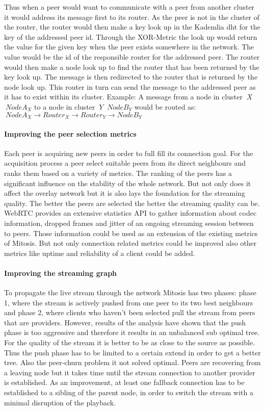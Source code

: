Thus when a peer would want to communicate with a peer from another cluster it would address its message first to its router. As the peer is not in the cluster of the router, the router would then make a key look up in the Kademlia \gls{dht} for the key of the addressed peer id. Through the XOR-Metric the look up would return the value for the given key when the peer exists somewhere in the network. The value would be the id of the responsible router for the addressed peer. 
The router would then make a node look up to find the router that has been returned by the key look up. The message is then redirected to the router that is returned by the node look up. This router in turn can send the message to the addressed peer as it has to exist within its cluster. 
Example: A message from a node in cluster $\ X $ $\ Node A_X $ to a node in cluster $\ Y $ $\ Node B_Y $ would be routed as:
$\ Node A_X \rightarrow Router_X \rightarrow Router_Y \rightarrow Node B_Y $
    
\paragraph{Improving the peer selection metrics}
Each peer is acquiring new peers in order to full fill its connection goal. For the acquisition process a peer select suitable peers from its direct neighbours and ranks them based on a variety of metrics. The ranking of the peers has a significant influence on the stability of the whole network. But not only does it affect the overlay network but it is also lays the foundation for the streaming quality. The better the peers are selected the better the streaming quality can be. 
WebRTC provides an extensive statistics API to gather information about codec information, dropped frames and jitter of an ongoing streaming session between to peers. Those information could be used as an extension of the existing metrics of Mitosis. 
But not only connection related metrics could be improved also other metrics like uptime and reliability of a client could be added.

\paragraph{Improving the streaming graph}
To propagate the live stream through the network Mitosis has two phases: phase 1, where the stream is actively pushed from one peer to its two best neighbours and phase 2, where clients who haven't been selected pull the stream from peers that are providers.
However, results of the analysis have shown that the push phase is too aggressive and therefore it results in an unbalanced sub optimal tree. For the quality of the stream it is better to be as close to the source as possible.
Thus the push phase has to be limited to a certain extend in order to get a better tree.
Also the peer-churn problem it not solved optimal. Peers are recovering from a leaving node but it takes time until the stream connection to another provider is established. As an improvement, at least one fallback connection has to be established to a sibling of the parent node, in order to switch the stream with a minimal disruption of the playback.

